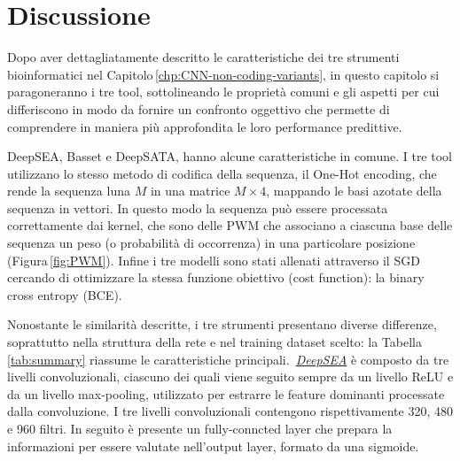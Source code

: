 
\chapter{Discussione}\label{chp:discussion}
% 
Dopo aver dettagliatamente descritto le caratteristiche dei tre strumenti bioinformatici nel Capitolo\,\ref{chp:CNN-non-coding-variants}, in questo capitolo si paragoneranno i tre tool, sottolineando le proprietà comuni e gli aspetti per cui differiscono in modo da fornire un confronto oggettivo che permette di comprendere in maniera più approfondita le loro performance predittive.

DeepSEA, Basset e DeepSATA, hanno alcune caratteristiche in comune. I tre tool utilizzano lo stesso metodo di codifica della sequenza, il One-Hot encoding, che rende la sequenza luna $M$ in una matrice $M\times 4$, mappando le basi azotate della sequenza in vettori. In questo modo la sequenza può essere processata correttamente dai kernel, che sono delle \acs{PWM} che associano a ciascuna base delle sequenza un peso (o probabilità di occorrenza) in una particolare posizione (Figura\,\ref{fig:PWM}). Infine i tre modelli sono stati allenati attraverso il \acs{SGD} cercando di ottimizzare la stessa funzione obiettivo (cost function): la binary cross entropy (\acs{BCE}).

\vspace{5px}

Nonostante le similarità descritte, i tre strumenti presentano diverse differenze, soprattutto nella struttura della rete e nel training dataset scelto: la Tabella\,\ref{tab:summary} riassume le caratteristiche principali. \,\hyperref[sec:DeepSEA]{\textsl{DeepSEA}} è composto da tre livelli convoluzionali, ciascuno dei quali viene seguito sempre da un livello \acs{ReLU} e da un livello max-pooling, utilizzato per estrarre le feature dominanti processate dalla convoluzione. I tre livelli convoluzionali contengono rispettivamente 320, 480 e 960 filtri. In seguito è presente un fully-conncted layer che prepara la informazioni per essere valutate nell'output layer, formato da una sigmoide.

